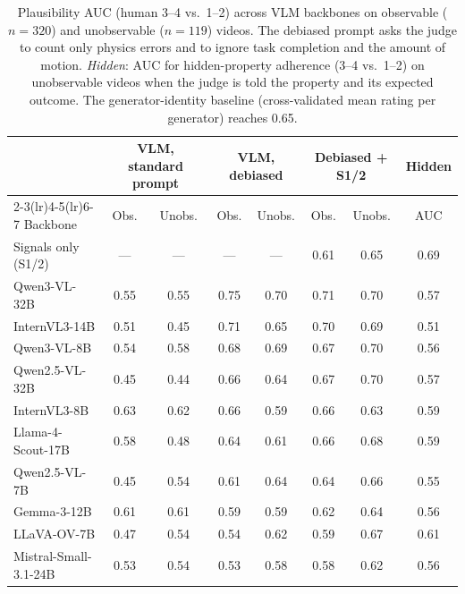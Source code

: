 \begin{table}[t]
    \centering
    \small
    \setlength{\tabcolsep}{3.5pt}
    \begin{tabular}{@{}lcccccc|c@{}}
        \toprule
        & \multicolumn{2}{c}{VLM, standard prompt} & \multicolumn{2}{c}{VLM, debiased} & \multicolumn{2}{c|}{Debiased + S1/2} & Hidden \\
        \cmidrule(lr){2-3}\cmidrule(lr){4-5}\cmidrule(lr){6-7}
        Backbone & Obs. & Unobs. & Obs. & Unobs. & Obs. & Unobs. & AUC \\
        \midrule
        Signals only (S1/2) & --- & --- & --- & --- & 0.61 & 0.65 & 0.69 \\
        Qwen3-VL-32B & 0.55 & 0.55 & 0.75 & 0.70 & 0.71 & 0.70 & 0.57 \\
        InternVL3-14B & 0.51 & 0.45 & 0.71 & 0.65 & 0.70 & 0.69 & 0.51 \\
        Qwen3-VL-8B & 0.54 & 0.58 & 0.68 & 0.69 & 0.67 & 0.70 & 0.56 \\
        Qwen2.5-VL-32B & 0.45 & 0.44 & 0.66 & 0.64 & 0.67 & 0.70 & 0.57 \\
        InternVL3-8B & 0.63 & 0.62 & 0.66 & 0.59 & 0.66 & 0.63 & 0.59 \\
        Llama-4-Scout-17B & 0.58 & 0.48 & 0.64 & 0.61 & 0.66 & 0.68 & 0.59 \\
        Qwen2.5-VL-7B & 0.45 & 0.54 & 0.61 & 0.64 & 0.64 & 0.66 & 0.55 \\
        Gemma-3-12B & 0.61 & 0.61 & 0.59 & 0.59 & 0.62 & 0.64 & 0.56 \\
        LLaVA-OV-7B & 0.47 & 0.54 & 0.54 & 0.62 & 0.59 & 0.67 & 0.61 \\
        Mistral-Small-3.1-24B & 0.53 & 0.54 & 0.53 & 0.58 & 0.58 & 0.62 & 0.56 \\
        \bottomrule
    \end{tabular}
    \caption{Plausibility AUC (human 3--4 vs.\ 1--2) across VLM backbones on observable ($n{=}320$) and unobservable ($n{=}119$) videos. The debiased prompt asks the judge to count only physics errors and to ignore task completion and the amount of motion. \emph{Hidden}: AUC for hidden-property adherence (3--4 vs.\ 1--2) on unobservable videos when the judge is told the property and its expected outcome. The generator-identity baseline (cross-validated mean rating per generator) reaches 0.65.}
    \label{tab:backbones-obs-unobs}
\end{table}
